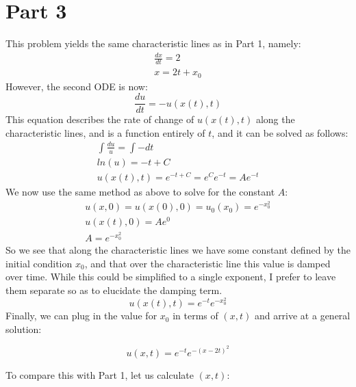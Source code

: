 \documentclass{article}
\begin{document}
\section*{Part 3}
This problem yields the same characteristic lines as in Part 1, namely:
\begin{equation}
\begin{aligned}
\frac{dx}{dt} = 2\\
x = 2t + x_0
\end{aligned}
\end{equation}
However, the second ODE is now:
\begin{equation}
\frac{du}{dt} = - u(x(t), t)
\end{equation}
This equation describes the rate of change of $u(x(t), t)$ along the characteristic lines, and is a function entirely of $t$, and it can be solved as follows:
\begin{equation}
\begin{aligned}
\int \frac{du}{u} = \int -dt\\
ln(u) = -t + C\\
u(x(t), t) = e^{-t + C} = e^Ce^{-t} = Ae^{-t}
\end{aligned}
\end{equation}
We now use the same method as above to solve for the constant $A$:
\begin{equation}
\begin{aligned}
u(x, 0)= u(x(0), 0) = u_0(x_0) = e^{-x_0^2}\\
u(x(t), 0) = Ae^0\\
A = e^{-x_0^2}
\end{aligned}
\end{equation}
So we see that along the characteristic lines we have some constant defined by the initial condition $x_0$, and that over the characteristic line this value is damped over time. While this could be simplified to a single exponent, I prefer to leave them separate so as to elucidate the damping term.
\begin{equation}
u(x(t), t) = e^{-t}e^{-x_0^2}
\end{equation}
Finally, we can plug in the value for $x_0$ in terms of $(x,t)$ and arrive at a general solution:
\begin{tcolorbox}[minipage,colback=white,arc=0pt,outer arc=0pt]
\begin{equation}
u(x, t) = e^{-t}e^{-(x-2t)^2}
\end{equation}
\end{tcolorbox}
To compare this with Part 1, let us calculate $(x,t)$:
\end{document}
